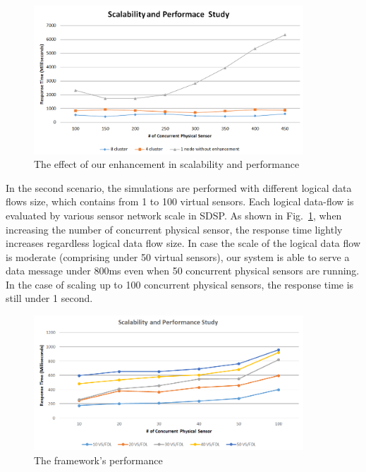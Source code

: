 \begin{figure}[h!] 
 \begin{center} 
 \includegraphics[width=0.9\textwidth]{./Part2/Chapter5/figures/vsf_scalability.png} 
    \caption{The effect of our enhancement in scalability and performance}
     \label{fig:c5_vsf_scalability}
  \end{center} 
\end{figure}

In the second scenario, the simulations are performed with different logical data flows size, which contains from 1 to 100 virtual sensors. Each logical data-flow is evaluated by various sensor network scale in SDSP. As shown in Fig.~\ref{fig:c5_vsf_scalability}, when increasing the number of concurrent physical sensor, the response time lightly increases regardless logical data flow size. In case the scale of the logical data flow is moderate (comprising under 50 virtual sensors), our system is able to serve a data message under 800ms even when 50 concurrent physical sensors are running. In the case of scaling up to 100 concurrent physical sensors, the response time is still under  1 second.

\begin{figure}[h!] 
 \begin{center} 
 \includegraphics[width=0.9\textwidth]{./Part2/Chapter5/figures/vsf_performance.png} 
    \caption{The framework’s performance}
     \label{fig:c5_vsf_performance}
  \end{center} 
\end{figure}

